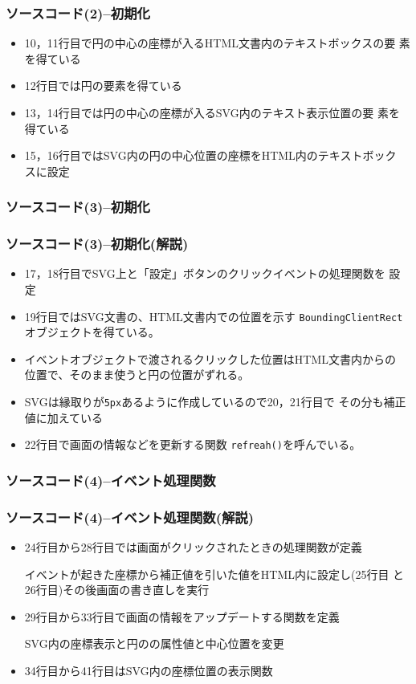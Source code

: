 \begin{frame}[containsverbatim]
 \frametitle{ソースコード(2)--初期化}
 \begin{itemize}
	\item 10，11行目で円の中心の座標が入るHTML文書内のテキストボックスの要
				素を得ている
	\item 12行目では円の要素を得ている
	\item 13，14行目では円の中心の座標が入るSVG内のテキスト表示位置の要
				素を得ている
	\item 15，16行目ではSVG内の円の中心位置の座標をHTML内のテキストボック
				スに設定
 \end{itemize}
\end{frame}
\begin{frame}[containsverbatim]
 \frametitle{ソースコード(3)--初期化}
\end{frame}
\begin{frame}[containsverbatim]
 \frametitle{ソースコード(3)--初期化(解説)}
 \begin{itemize}
	\item 17，18行目でSVG上と「設定」ボタンのクリックイベントの処理関数を
        設定
	\item 19行目ではSVG文書の、HTML文書内での位置を示す
				\texttt{BoundingClientRect}オブジェクトを得ている。
	\item イベントオブジェクトで渡されるクリックした位置はHTML文書内からの
        位置で、そのまま使うと円の位置がずれる。
	\item SVGは縁取りが\texttt{5px}あるように作成しているので20，21行目で
				その分も補正値に加えている
	\item 22行目で画面の情報などを更新する関数
				\texttt{refreah()}を呼んでいる。
 \end{itemize}
\end{frame}
\begin{frame}[containsverbatim]
 \frametitle{ソースコード(4)--イベント処理関数}
\end{frame}
\begin{frame}[containsverbatim]
 \frametitle{ソースコード(4)--イベント処理関数(解説)}
\begin{itemize}
	\item 24行目から28行目では画面がクリックされたときの処理関数が定義

				イベントが起きた座標から補正値を引いた値をHTML内に設定し(25行目
				と26行目)その後画面の書き直しを実行
	\item 29行目から33行目で画面の情報をアップデートする関数を定義

				SVG内の座標表示と円のの属性値と中心位置を変更
	\item 34行目から41行目はSVG内の座標位置の表示関数
 \end{itemize}
\end{frame}
